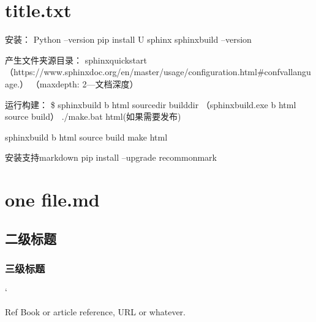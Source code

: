 \documentclass[letterpaper,10pt,english]{sphinxmanual}
\begin{document}
\chapter{title.txt}
\label{\detokenize{12.8:title-txt}}\label{\detokenize{12.8::doc}}
安装：
Python –version
pip install \sphinxhyphen{}U sphinx
sphinx\sphinxhyphen{}build –version

产生文件夹源目录：
sphinx\sphinxhyphen{}quickstart
（https://www.sphinx\sphinxhyphen{}doc.org/en/master/usage/configuration.html\#confval\sphinxhyphen{}language.）
（maxdepth: 2—文档深度）

运行构建：
\$ sphinx\sphinxhyphen{}build \sphinxhyphen{}b html sourcedir builddir
（sphinx\sphinxhyphen{}build.exe \sphinxhyphen{}b html source build）
./make.bat html(如果需要发布)

sphinx\sphinxhyphen{}build \sphinxhyphen{}b html source build
make html

安装支持markdown
pip install –upgrade recommonmark


\chapter{one file.md}
\label{\detokenize{aa:one-file-md}}\label{\detokenize{aa::doc}}

\section{二级标题}
\label{\detokenize{aa:id1}}

\subsection{三级标题}
\label{\detokenize{aa:id2}}
`

\begin{sphinxthebibliography}{Ref}
Book or article reference, URL or whatever.
\end{sphinxthebibliography}



\renewcommand{\indexname}{索引}
\printindex
\end{document}
